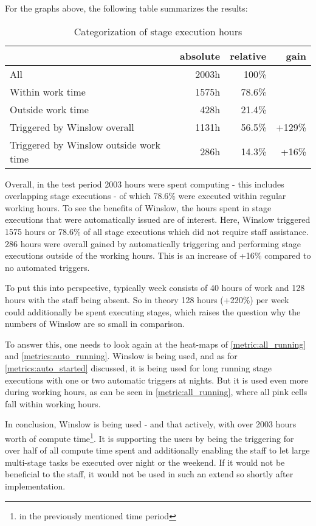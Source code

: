 For the graphs above, the following table summarizes the results:

\begin{table}[H]
	\centering
	\begin{tabular}{l|r|r|r}
												& absolute 			& relative	& gain \\
		\hline
		All 		 							& 2003h 			& 100\% 	& \\
		Within work time						& 1575h				& 78.6\% 	& \\
		Outside work time	 					&  428h 			& 21.4\% 	& \\
		Triggered by Winslow overall			& 1131h				& 56.5\%	& +129\%\\
		Triggered by Winslow outside work time	&  286h  			& 14.3\% 	& +16\%\\
		 
	\end{tabular}
	\caption{Categorization of stage execution hours}
\end{table}

Overall, in the test period 2003 hours were spent computing - this includes overlapping stage executions - of which 78.6\% were executed within regular working hours.
To see the benefits of Winslow, the hours spent in stage executions that were automatically issued are of interest.
Here, Winslow triggered 1575 hours or 78.6\% of all stage executions which did not require staff assistance.
286 hours were overall gained by automatically triggering and performing stage executions outside of the working hours.
This is an increase of +16\% compared to no automated triggers.

To put this into perspective, typically week consists of 40 hours of work and 128 hours with the staff being absent.
So in theory 128 hours (+220\%) per week could additionally be spent executing stages, which raises the question why the numbers of Winslow are so small in comparison.

To answer this, one needs to look again at the heat-maps of \autoref{metric:all_running} and \autoref{metrics:auto_running}.
Winslow is being used, and as for \autoref{metrics:auto_started} discussed, it is being used for long running stage executions with one or two automatic triggers at nights.
But it is used even more during working hours, as can be seen in \autoref{metric:all_running}, where all pink cells fall within working hours.

In conclusion, Winslow is being used - and that actively, with over 2003 hours worth of compute time\footnote{in the previously mentioned time period}.
It is supporting the users by being the triggering for over half of all compute time spent and additionally enabling the staff to let large multi-stage tasks be executed over night or the weekend.
If it would not be beneficial to the staff, it would not be used in such an extend so shortly after implementation.

